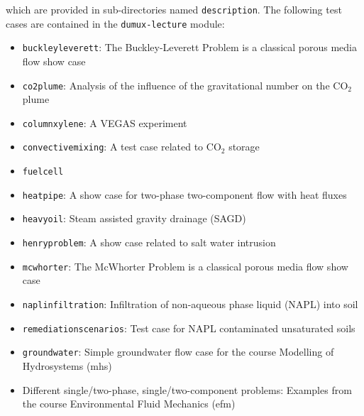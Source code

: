 which are provided in sub-directories named \texttt{description}. The following test cases are 
contained in the \texttt{dumux-lecture} module:
\begin{itemize}
\item \texttt{buckleyleverett}: The Buckley-Leverett Problem is a classical porous media flow show case
\item \texttt{co2plume}: Analysis of the influence of the gravitational number on the $\text{CO}_2$ plume 
\item \texttt{columnxylene}: A VEGAS experiment
\item \texttt{convectivemixing}: A test case related to CO$_2$ storage
\item \texttt{fuelcell}%
\item \texttt{heatpipe}: A show case for two-phase two-component flow with heat fluxes
\item \texttt{heavyoil}: Steam assisted gravity drainage (SAGD)
\item \texttt{henryproblem}: A show case related to salt water intrusion
\item \texttt{mcwhorter}: The McWhorter Problem is a classical porous media flow show case
\item \texttt{naplinfiltration}: Infiltration of non-aqueous phase liquid (NAPL) into soil
\item \texttt{remediationscenarios}: Test case for NAPL contaminated unsaturated soils
\item \texttt{groundwater}: Simple groundwater flow case for the course Modelling of Hydrosystems (mhs)
\item Different single/two-phase, single/two-component problems: Examples from the course Environmental Fluid Mechanics (efm)
\end{itemize}
